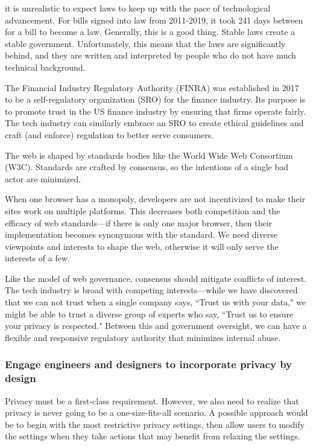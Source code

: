 it is unrealistic to expect laws to keep up with the pace of technological advancement. For bills signed into law from 2011-2019, it took 241 days between for a bill to become a law. Generally, this is a good thing. Stable laws create a stable government. Unfortunately, this means that the laws are significantly behind, and they are written and interpreted by people who do not have much technical background.

The Financial Industry Regulatory Authority (FINRA) was established in 2017 to be a self-regulatory organization (SRO) for the finance industry. Its purpose is to promote trust in the US finance industry by ensuring that firms operate fairly. The tech industry can similarly embrace an SRO to create ethical guidelines and craft (and enforce) regulation to better serve consumers\cite{reich}.

The web is shaped by standards bodies like the World Wide Web Consortium (W3C). Standards are crafted by consensus, so the intentions of a single bad actor are minimized.

When one browser has a monopoly, developers are not incentivized to make their sites work on multiple platforms. This decreases both competition and the efficacy of web standards---if there is only one major browser, then their implementation becomes synonymous with the standard. We need diverse viewpoints and interests to shape the web, otherwise it will only serve the interests of a few.

Like the model of web governance, consensus should mitigate conflicts of interest. The tech industry is broad with competing interests---while we have discovered that we can not trust when a single company says, ``Trust us with your data," we might be able to trust a diverse group of experts who say, ``Trust us to ensure your privacy is respected." Between this and government oversight, we can have a flexible and responsive regulatory authority that minimizes internal abuse.

\subsubsection{Engage engineers and designers to incorporate privacy by design}

Privacy must be a first-class requirement. However, we also need to realize that privacy is never going to be a one-size-fits-all scenario. A possible approach would be to begin with the most restrictive privacy settings, then allow users to modify the settings when they take actions that may benefit from relaxing the settings.

